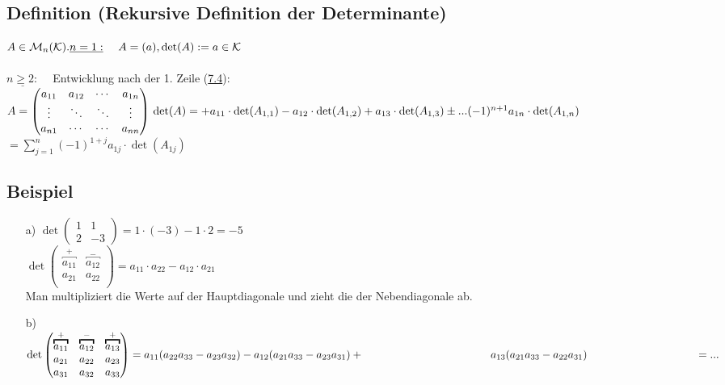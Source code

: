 \documentclass[a4paper, 12pt,titlepage, pdf, headsepline]{article}
\newcommand{\K}{\mathcal{K}}
\newcommand{\M}{\mathcal{M}}
\renewcommand{\>}{\rightarrow}
\renewcommand{\*}{\cdot}
\begin{document}
\subsection{Definition (Rekursive Definition der Determinante)}
\label{8.2}
$A \in \M_n(\K).\\
\\
\underline{n = 1:} ~~~~A = (a), \det(A) := a \in \K$\\
\\
$\underline{n \geq 2:}~~~~$ Entwicklung nach der 1. Zeile (\hyperref[7.4]{7.4}): \\

$A = \begin{pmatrix}
a_{11} & a_{12} & \cdots & a_{1n} \\
\vdots & \ddots &\ddots & \vdots \\
a_{n1} & \cdots & \cdots & a_{nn} \\
\end{pmatrix}\\ 
\\
\det(A) =+a_{11}\cdot \det(A_{1,1})- a_{12}\cdot \det(A_{1,2}) + a_{13}\cdot \det(A_{1,3}) \pm ... (-1)^{n+1}a_{1n}\cdot \det(A_{1,n})$
\noindent\hspace*{12mm}$= \sum_{j = 1}^{n} (-1)^{1+j} a_{1j} \cdot \det(A_{1j})$
\subsection{Beispiel}
\begin{itemize}
	\item[a)] $\det\begin{pmatrix}
	1 & 1 \\
	2 & -3
	\end{pmatrix} = 1 \cdot (-3) - 1 \cdot 2 = -5$\\
	$\det\begin{pmatrix}
	\overbracket{a_{11}}^{+} & \overbracket{a_{12}}^{-} \\
	a_{21} & a_{22} \\
	\end{pmatrix} = a_{11} \cdot a_{22} - a_{12} \cdot a_{21}$  \\
	 Man multipliziert die Werte auf der Hauptdiagonale und zieht die der Nebendiagonale ab.
	\item[b)] $\det\begin{pmatrix}
	\overbracket{a_{11}}^{+} &\overbracket{a_{12}}^{-} & \overbracket{a_{13}}^{+} \\
	a_{21} &a_{22} & a_{23} \\
	a_{31} &a_{32} & a_{33} \\
	\end{pmatrix} = a_{11}(a_{22}a_{33} - a_{23}a_{32}) - a_{12}(a_{21}a_{33} - a_{23}a_{31}) + \\
	\noindent\hspace*{41mm}a_{13}(a_{21}a_{33} - a_{22}a_{31}) \\\noindent\hspace*{35mm}= ...$\\
\end{itemize}
\end{document}
